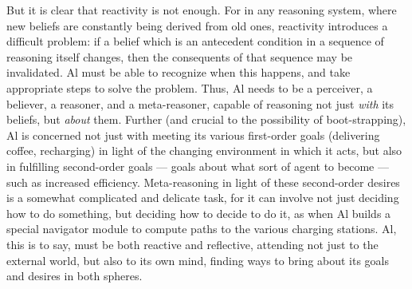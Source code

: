 \documentclass{llncs}
\begin{document}
But it is clear that reactivity is not enough.  For in any reasoning
system, where new beliefs are constantly being derived from old ones,
reactivity introduces a difficult problem: if a belief which is an
antecedent condition in a sequence of reasoning itself changes, then the
consequents of that sequence may be invalidated.  Al must be able to
recognize when this happens, and take appropriate steps to solve the
problem.  Thus, Al needs to be a perceiver, a believer, a reasoner, and a
meta-reasoner, capable of reasoning not just {\em with} its beliefs, but
{\em about} them.  Further (and crucial to the possibility of
boot-strapping), Al is concerned not just with meeting its various
first-order goals (delivering coffee, recharging) in light of the changing
environment in which it acts, but also in fulfilling second-order goals
\cite{Frankfurt:Importance} --- goals about what sort of agent to become
--- such as increased efficiency.  Meta-reasoning in light of these
second-order desires is a somewhat complicated and delicate task, for it
can involve not just deciding how to do something, but deciding how to
decide to do it, as when Al builds a special navigator module to compute
paths to the various charging stations.  Al, this is to say, must be both
reactive and reflective, attending not just to the external world, but also
to its own mind, finding ways to bring about its goals and desires in both
spheres.
\end{document}
